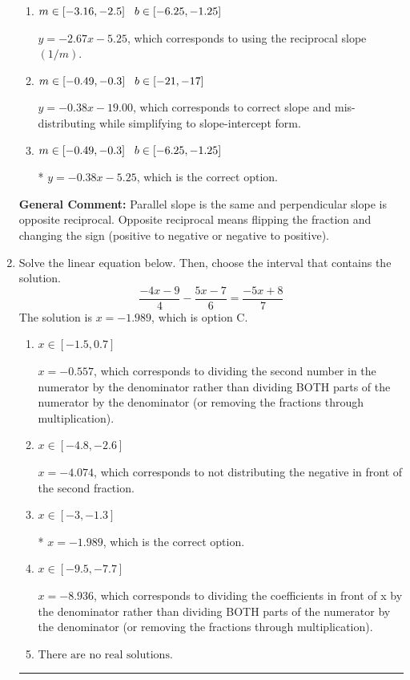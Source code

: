 \documentclass{extbook}[14pt]
\newcommand{\litem}[1]{\item #1

\rule{\textwidth}{0.4pt}}
\begin{document}
\begin{enumerate}
{\begin{enumerate}[label=\Alph*.]
 $y = -0.38x + 5.25$, which corresponds to using the correct slope and getting the negative $y$-intercept.
\item \( m \in [-3.16, -2.5] \hspace*{3mm} b \in [-6.25, -1.25] \)

 $y = -2.67x - 5.25$, which corresponds to using the reciprocal slope $(1/m)$.
\item \( m \in [-0.49, -0.3] \hspace*{3mm} b \in [-21, -17] \)

 $y = -0.38x - 19.00$, which corresponds to correct slope and mis-distributing while simplifying to slope-intercept form.
\item \( m \in [-0.49, -0.3] \hspace*{3mm} b \in [-6.25, -1.25] \)

* $y = -0.38x - 5.25$, which is the correct option.
\end{enumerate}

\textbf{General Comment:} Parallel slope is the same and perpendicular slope is opposite reciprocal. Opposite reciprocal means flipping the fraction and changing the sign (positive to negative or negative to positive).
}
\litem{
Solve the linear equation below. Then, choose the interval that contains the solution.
\[ \frac{-4x -9}{4} - \frac{5x -7}{6} = \frac{-5x + 8}{7} \]The solution is \( x = -1.989 \), which is option C.\begin{enumerate}[label=\Alph*.]
\item \( x \in [-1.5, 0.7] \)

 $x = -0.557$, which corresponds to dividing the second number in the numerator by the denominator rather than dividing BOTH parts of the numerator by the denominator (or removing the fractions through multiplication).
\item \( x \in [-4.8, -2.6] \)

 $x = -4.074$, which corresponds to not distributing the negative in front of the second fraction.
\item \( x \in [-3, -1.3] \)

* $x = -1.989$, which is the correct option.
\item \( x \in [-9.5, -7.7] \)

 $x = -8.936$, which corresponds to dividing the coefficients in front of x by the denominator rather than dividing BOTH parts of the numerator by the denominator (or removing the fractions through multiplication).
\item \( \text{There are no real solutions.} \)


\end{enumerate}}
\end{enumerate}
\end{document}

